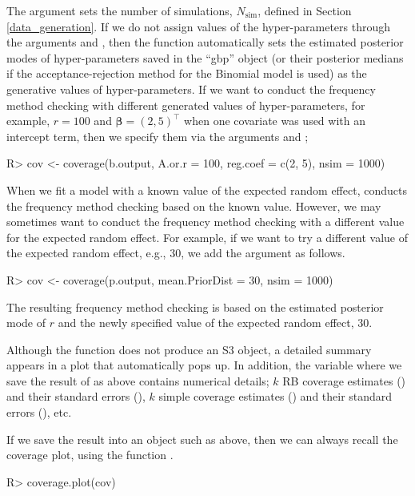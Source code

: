 \documentclass[article]{jss}
\begin{document}
The argument  sets the number of simulations, $N_{\textrm{sim}}$, defined in Section \ref{data_generation}. If we do not assign values of the hyper-parameters through the arguments  and , then the function  automatically sets the estimated posterior modes of hyper-parameters saved in the ``gbp'' object (or their posterior medians if the acceptance-rejection method for the Binomial model is used) as the generative values of hyper-parameters. If we want to conduct the frequency method checking with different generated values of hyper-parameters, for example, $r=100$ and $\boldsymbol{\beta}=(2, 5)^\top$ when one covariate was used with an intercept term, then we specify them via the arguments  and ;
\begin{CodeChunk}
\begin{CodeInput}
R> cov <- coverage(b.output, A.or.r = 100, reg.coef = c(2, 5), nsim = 1000)
\end{CodeInput}
\end{CodeChunk}

When we fit a model with a known value of the expected random effect,  conducts the frequency method checking based on the known value. However, we may sometimes want to conduct the frequency method checking with a different value for the expected random effect. For example, if we want to try a different value of the expected random effect, e.g., 30, we add the argument  as follows.
\begin{CodeChunk}
\begin{CodeInput}
R> cov <- coverage(p.output, mean.PriorDist = 30, nsim = 1000)
\end{CodeInput}
\end{CodeChunk}
The resulting frequency method checking is based on the estimated posterior mode of $r$ and the newly specified value of the expected random effect, 30.

Although the function  does not produce an S3 object, a detailed summary appears in a plot that automatically pops up. In addition, the variable   where we save  the result of  as above contains numerical details; $k$ RB coverage estimates () and their standard errors (), $k$ simple coverage estimates () and their standard errors (), etc.


If we save the result into an object such as  above, then we can always recall the coverage plot, using the function .
\begin{CodeChunk}
\begin{CodeInput}
R> coverage.plot(cov)
\end{CodeInput}
\end{CodeChunk}
\end{document}
